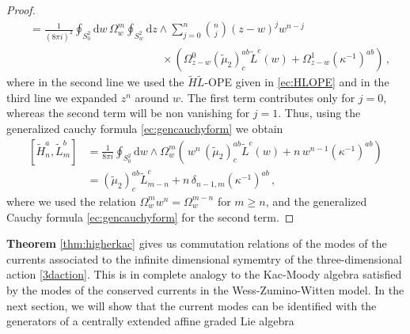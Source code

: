 \documentclass[11pt]{amsart}
\newcommand{\tL}{{\tilde L}}
\newcommand{\tH}{{\tilde H}}
\newcommand{\dr}{{\mathrm{d}}}
\numberwithin{equation}{section}
\numberwithin{figure}{section}
\numberwithin{table}{section}
\theoremstyle{thm}
\numberwithin{equation}{subsection}
\theoremstyle{definition}
\theoremstyle{rem}
\newtheorem{remark}{Remark}
\begin{document}
\begin{proof}
\begin{equation}
\begin{split}
    &= \frac{1}{(8\pi i)^2}\oint_{S_0^2} \dr w \,\Omega_w^m \oint_{S_w^2} \dr z \wedge \sum_{j=0}^n\binom{n}{j}(z-w)^j w^{n-j} \\
    &  \hspace{5cm}\times\left(\Omega_{z-w}^0 (\tilde \mu_2)^{ab}_c \tL^c(w) + \Omega_{z-w}^1(\kappa^{-1})^{ab} \right)\,,
\end{split}
\end{equation}
where in the second line we used the $\tH \tL$-OPE given in \eqref{ec:HLOPE} and in the third line we expanded $z^n$ around $w$. The first term contributes only for $j=0$, whereas the second term will be non vanishing for $j=1$. Thus, using the generalized cauchy formula \eqref{ec:gencauchyform} we obtain
\begin{equation}
\begin{split}
    [\tH_n^a,\tL_m^b] 
    &= \frac{1}{8\pi i}\oint_{S_0^2} \dr w \wedge\Omega_w^m \left(\,w^n\,(\tilde \mu_2)^{ab}_c \tL^c(w)  +n\,w^{n-1}(\kappa^{-1})^{ab} \right)\\
    &=(\tilde \mu_2)^{ab}_c \tL_{m-n}^c + n\,\delta_{n-1,m}(\kappa^{-1})^{ab} \,,
\end{split}
\end{equation}
where we used the relation $\Omega_w^m w^n = \Omega_w^{m-n}$ for $m\geq n$, and the generalized Cauchy formula \eqref{ec:gencauchyform} for the second term.

\end{proof}


\textbf{Theorem} \ref{thm:higherkac} gives us commutation relations of the modes of the currents associated to the infinite dimensional symemtry of the three-dimensional
action \eqref{3daction}. This is in complete analogy to the Kac-Moody algebra satisfied
by the modes of the conserved currents in the Wess-Zumino-Witten model. In
the next section, we will show that the current modes can be identified with the
generators of a centrally extended affine graded Lie algebra

\end{document}
